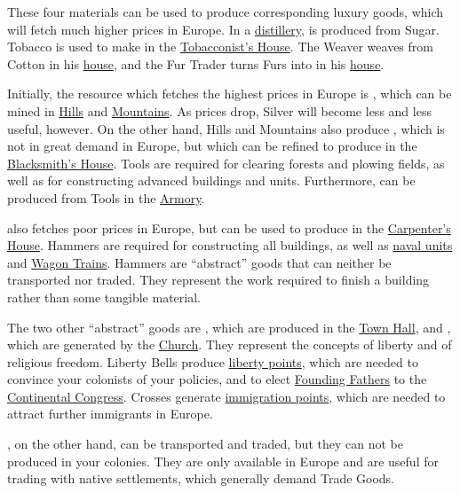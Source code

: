 \documentclass[12pt]{book}
\begin{document}
These four materials can be used to produce corresponding luxury
goods, which will fetch much higher prices in Europe. In a
\hyperlink{Distiller's House}{distillery},  is produced
from Sugar. Tobacco is used to make  in the
\hyperlink{Tobacconist's House}{Tobacconist's House}. The Weaver
weaves  from Cotton in his \hyperlink{Weaver's
House}{house}, and the Fur Trader turns Furs into  in his
\hyperlink{Fur Trader's House}{house}.

Initially, the resource which fetches the highest prices in Europe is
, which can be mined in \hyperlink{Hills}{Hills} and
\hyperlink{Mountains}{Mountains}. As prices drop, Silver will become
less and less useful, however. On the other hand, Hills and Mountains
also produce , which is not in great demand in Europe, but
which can be refined to produce  in the
\hyperlink{Blacksmith's House}{Blacksmith's House}. Tools are required
for clearing forests and plowing fields, as well as for constructing
advanced buildings and units. Furthermore,  can be
produced from Tools in the \hyperlink{Armory}{Armory}.

 also fetches poor prices in Europe, but can be used to
produce  in the \hyperlink{Carpenter's
House}{Carpenter's House}. Hammers are required for constructing all
buildings, as well as \hyperlink{Naval Units}{naval units} and
\hyperlink{Wagon Train}{Wagon Trains}. Hammers are ``abstract'' goods
that can neither be transported nor traded. They represent the work
required to finish a building rather than some tangible material.

The two other ``abstract'' goods are , which are
produced in the \hyperlink{Town Hall}{Town Hall}, and ,
which are generated by the \hyperlink{Church}{Church}. They represent
the concepts of liberty and of religious freedom. Liberty Bells
produce \hyperlink{Liberty}{liberty points}, which are needed to
convince your colonists of your policies, and to elect
\hyperlink{Founding Fathers}{Founding Fathers} to the
\hyperlink{Continental Congress}{Continental Congress}. Crosses
generate \hyperlink{Immigration}{immigration points}, which are needed
to attract further immigrants in Europe.

, on the other hand, can be transported and traded,
but they can not be produced in your colonies. They are only available
in Europe and are useful for trading with native settlements, which
generally demand Trade Goods.
\end{document}
